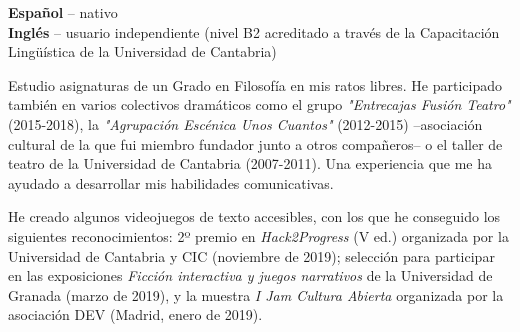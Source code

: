\documentclass[9pt]{developercv} %
\begin{document}
\begin{minipage}[t]{0.3\textwidth}
	\vspace{-\baselineskip} %

	
	\textbf{Español} -- nativo\\
	\textbf{Inglés} -- usuario independiente (nivel B2 acreditado a través de la Capacitación Lingüística de la Universidad de Cantabria)\\
\end{minipage}
\hfill
\begin{minipage}[t]{0.3\textwidth}
	\vspace{-\baselineskip} %
	

	Estudio asignaturas de un Grado en Filosofía en mis ratos libres. He participado también en varios colectivos dramáticos como el grupo \emph{"Entrecajas Fusión Teatro"} (2015-2018), la \emph{"Agrupación Escénica Unos Cuantos"} (2012-2015) --asociación cultural de la que fui miembro fundador junto a otros compañeros-- o el taller de teatro de la Universidad de Cantabria (2007-2011). Una experiencia que me ha ayudado a desarrollar mis habilidades comunicativas.

\end{minipage}
\hfill
\begin{minipage}[t]{0.3\textwidth}
	\vspace{-\baselineskip} %
	

	He creado algunos videojuegos de texto accesibles, con los que he conseguido los siguientes reconocimientos: 2º premio en \emph{Hack2Progress} (V ed.) organizada por la Universidad de Cantabria y CIC (noviembre de 2019); selección para participar en las exposiciones \emph{Ficción interactiva y juegos narrativos} de la Universidad de Granada (marzo de 2019), y la muestra \emph{I Jam Cultura Abierta} organizada por la asociación DEV (Madrid, enero de 2019).
\end{minipage}
\end{document}
